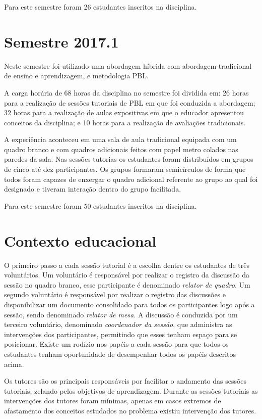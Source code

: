 Para este semestre foram 26 estudantes inscritos na disciplina.

\section{Semestre 2017.1}
Neste semestre foi utilizado uma abordagem híbrida com abordagem tradicional de ensino
e aprendizagem, e metodologia PBL.

A carga horária de 68 horas da disciplina no semestre foi dividida em:
26 horas para a realização de sessões tutoriais de PBL em que foi conduzida a abordagem;
32 horas para a realização de aulas expositivas em que o educador apresentou conceitos da disciplina;
e 10 horas para a realização de avaliações tradicionais.

A experiência aconteceu em uma sala de aula tradicional equipada com um
quadro branco e com quadros adicionais feitos com papel metro colados nas paredes da sala.
Nas sessões tutorias os estudantes foram distribuídos em grupos de cinco até dez participantes.
Os grupos formaram semicírculos de forma que todos foram capazes de
enxergar o quadro adicional referente ao grupo ao qual foi designado
e tiveram interação dentro do grupo facilitada.

Para este semestre foram 50 estudantes inscritos na disciplina.

\section{Contexto educacional}
O primeiro passo a cada sessão tutorial é a escolha dentre os
estudantes de três voluntários.
Um voluntário é responsável por realizar o registro da discussão
da sessão no quadro branco, esse
participante é denominado \textit{relator de quadro}.
Um segundo voluntário é responsável por realizar o registro
das discussões e disponibilizar um documento consolidado para todos
os participantes logo após
a sessão, sendo denominado \textit{relator de mesa}.
A discussão é conduzida por um terceiro voluntário,
denominado \textit{coordenador da sessão}, que administra
as intervenções dos participantes, permitindo que esses
tenham espaço para se posicionar.
Existe um rodízio nos papéis a cada sessão para que todos
os estudantes tenham oportunidade de desempenhar todos
os papéis descritos acima.

Os tutores são os principais responsáveis por facilitar o andamento
das sessões tutoriais, zelando pelos objetivos de aprendizagem.
Durante as sessões tutoriais as intervenções dos tutores
foram mínimas, apenas em casos extremos de
afastamento dos conceitos estudados no problema existiu intervenção dos tutores.

